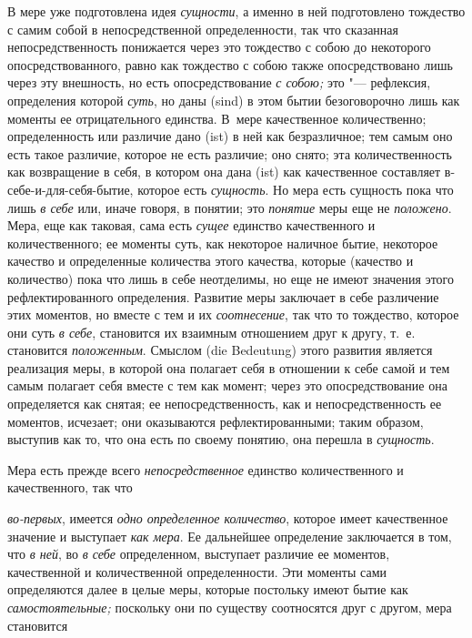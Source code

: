 В мере уже подготовлена идея {\em сущности}, а именно в
ней подготовлено тождество с самим собой в непосредственной определенности,
так что сказанная непосредственность понижается через это тождество с собою
до некоторого опосредствованного, равно как тождество с собою также
опосредствовано лишь через эту внешность, но есть опосредствование
{\em с собою;} это "--- рефлексия, определения которой
{\em суть}, но даны (sind) в этом бытии безоговорочно
лишь как моменты ее отрицательного единства. В~мере качественное
количественно; определенность или различие дано (ist) в ней как
безразличное; тем самым оно есть такое различие, которое не есть различие;
оно снято; эта количественность как возвращение в себя, в котором она дана
(ist) как качественное составляет в-себе-и-для-себя-бытие, которое есть
{\em сущность}. Но мера есть сущность пока что лишь
{\em в себе} или, иначе говоря, в понятии; это
{\em понятие} меры еще не
{\em положено}. Мера, еще как таковая, сама есть
{\em сущее} единство качественного и количественного;
ее моменты суть, как некоторое наличное бытие, некоторое качество и
определенные количества этого качества, которые (качество и количество)
пока что лишь в себе неотделимы, но еще не имеют значения этого
рефлектированного определения. Развитие меры заключает в себе различение
этих моментов, но вместе с тем и их {\em соотнесение},
так что то тождество, которое они суть {\em в себе},
становится их взаимным отношением друг к другу, т.~е. становится
{\em положенным}. Смыслом (die Bedeutung) этого
развития является реализация меры, в которой она полагает себя в отношении
к себе самой и тем самым полагает себя вместе с тем как момент; через это
опосредствование она определяется как снятая; ее непосредственность, как и
непосредственность ее моментов, исчезает; они оказываются
рефлектированными; таким образом, выступив как то, что она есть по своему
понятию, она перешла в {\em сущность}.

Мера есть прежде всего {\em непосредственное} единство
количественного и качественного, так что

{\em во-первых}, имеется {\em одно
определенное количество}, которое имеет качественное значение и выступает
{\em как мера}. Ее дальнейшее определение заключается в
том, что {\em в ней}, во {\em в
себе} определенном, выступает различие ее моментов, качественной и
количественной определенности. Эти моменты сами определяются далее в целые
меры, которые постольку имеют бытие как
{\em самостоятельные;} поскольку они по существу
соотносятся друг с другом, мера становится


